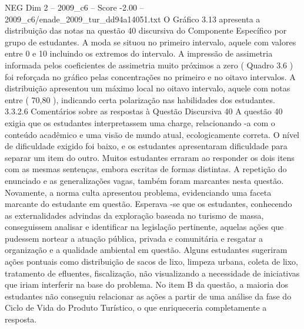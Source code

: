 \begin{textsample}{NEG Dim 2 – 2009\_c6 – Score -2.00 – 2009\_c6/enade\_2009\_tur\_dd94a14051.txt}
O Gráfico 3.13 apresenta a distribuição das notas na questão 40 discursiva do Componente Específico por grupo de estudantes.
A moda se situou no primeiro intervalo, aquele com valores entre 0 e 10 incluindo os extremos do intervalo.
A impressão de assimetria informada pelos coeficientes de assimetria muito próximos a zero ( Quadro 3.6 ) foi reforçada no gráfico pelas concentrações no primeiro e no oitavo intervalos.
A distribuição apresentou um máximo local no oitavo intervalo, aquele com notas entre ( 70,80 ), indicando certa polarização nas habilidades dos estudantes. 3.3.2.6 Comentários sobre as respostas à Questão Discursiva 40 A questão 40 exigia que os estudantes interpretassem uma charge, relacionando -a com o conteúdo acadêmico e uma visão de mundo atual, ecologicamente correta.
O nível de dificuldade exigido foi baixo, e os estudantes apresentaram dificuldade para separar um item do outro.
Muitos estudantes erraram ao responder os dois itens com as mesmas sentenças, embora escritas de formas distintas.
A repetição do enunciado e as generalizações vagas, também foram marcantes nesta questão.
Novamente, a norma culta apresentou problema, evidenciando uma faceta marcante do estudante em questão.
Esperava -se que os estudantes, conhecendo as externalidades advindas da exploração baseada no turismo de massa, conseguissem analisar e identificar na legislação pertinente, aquelas ações que pudessem nortear a atuação pública, privada e comunitária e resgatar a organização e a qualidade ambiental em questão.
Alguns estudantes sugeriram ações pontuais como distribuição de sacos de lixo, limpeza urbana, coleta de lixo, tratamento de efluentes, fiscalização, não visualizando a necessidade de iniciativas que iriam interferir na base do problema.
No item B da questão, a maioria dos estudantes não conseguiu relacionar as ações a partir de uma análise da fase do Ciclo de Vida do Produto Turístico, o que enriqueceria completamente a resposta.

\end{textsample}
